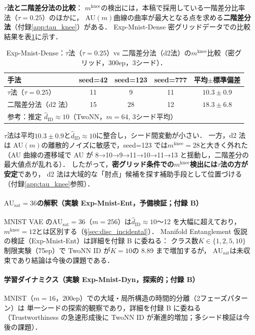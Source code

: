 \documentclass[11pt,a4paper]{jsarticle}
\newcommand{\AUsat}{\mathrm{AU}_{\mathrm{sat}}}
\newcommand{\mknee}{m^{\mathrm{knee}}}
\begin{document}
\noindent
\textbf{$\tau$法と二階差分法の比較}：
$\mknee$の検出には，本稿で採用している一階差分比率法（$\tau = 0.25$）のほかに，
AU$(m)$曲線の曲率が最大となる点を求める\textbf{二階差分法}（付録\ref{app:tau_knee}）がある．
Exp-Mnist-Dense 密グリッドデータでの比較結果を表\ref{tab:el_knee_compare}に示す．

\begin{table}[H]
\centering
\caption{Exp-Mnist-Dense：$\tau$法（$\tau=0.25$）vs 二階差分法（d2法）の$\mknee$比較（密グリッド，300ep，3シード）．}
\label{tab:el_knee_compare}
\small
\begin{tabular}{lcccc}
\toprule
手法 & seed=42 & seed=123 & seed=777 & 平均$\pm$標準偏差 \\
\midrule
$\tau$法（$\tau=0.25$） & 11 & 9  & 11 & $10.3 \pm 0.9$ \\
二階差分法（d2 法）     & 15 & 28 & 12 & $18.3 \pm 6.8$ \\
\midrule
\multicolumn{5}{l}{参考：推定 $\hat{d}_\mathrm{ID} \approx 10$（TwoNN，$m=64$, 3シード平均）} \\
\bottomrule
\end{tabular}
\end{table}

$\tau$法は平均$10.3 \pm 0.9$と$\hat{d}_\mathrm{ID} \approx 10$に整合し，シード間変動が小さい．
一方，d2 法は AU$(m)$の離散的ノイズに敏感で，seed=123 では$\mknee = 28$と大きく外れた
（AU 曲線の遷移域で AU が 8→10→9→11→10→11→13 と揺動し，二階差分の最大値点が乱れる）．
したがって，\textbf{密グリッド条件での$\mknee$検出には$\tau$法の方が安定}であり，
d2 法は大域的な「肘点」候補を探す補助手段として位置づける（付録\ref{app:tau_knee}参照）．

\paragraph{$\AUsat = 36$の解釈（実験 Exp-Mnist-Ent，予備検証；付録 B）}
MNIST VAE の$\AUsat = 36$（$m=256$）は$\hat{d}_\mathrm{ID} \approx 10$〜12 を大幅に超えており，
$\mknee = 12$とは区別する（§\ref{sec:disc_incidental}）．
Manifold Entanglement 仮説の検証（Exp-Mnist-Ent）は詳細を付録 B に委ねる：
クラス数$K \in \{1,2,5,10\}$制限実験（75ep）で TwoNN ID が$K=10$の 8.89 まで増加するが，
$\AUsat$は未収束であり結論は今後の課題である．

\paragraph{学習ダイナミクス（実験 Exp-Mnist-Dyn，探索的；付録 B）}
MNIST（$m=16$，200ep）での大域・局所構造の時間的分離（2フェーズパターン）は
単一シードの探索的観察であり，詳細を付録 B に委ねる
（Trustworthiness の急速形成後に TwoNN ID が漸進的増加；多シード検証は今後の課題）．
\end{document}
